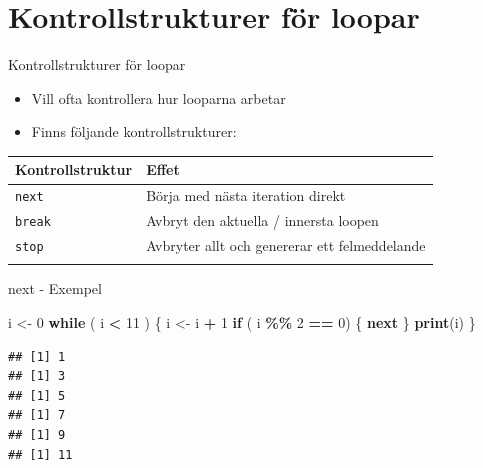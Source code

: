 \documentclass[
  11pt,
  ignorenonframetext,
]{beamer}
\newenvironment{Shaded}{\begin{snugshade}}{\end{snugshade}}
\newcommand{\ControlFlowTok}[1]{\textcolor[rgb]{0.13,0.29,0.53}{\textbf{#1}}}
\newcommand{\DecValTok}[1]{\textcolor[rgb]{0.00,0.00,0.81}{#1}}
\newcommand{\FunctionTok}[1]{\textcolor[rgb]{0.13,0.29,0.53}{\textbf{#1}}}
\newcommand{\NormalTok}[1]{#1}
\newcommand{\OtherTok}[1]{\textcolor[rgb]{0.56,0.35,0.01}{#1}}
\newcommand{\SpecialCharTok}[1]{\textcolor[rgb]{0.81,0.36,0.00}{\textbf{#1}}}
\providecommand{\tightlist}{%
  \setlength{\itemsep}{0pt}\setlength{\parskip}{0pt}}
\begin{document}
\section{Kontrollstrukturer för
loopar}\label{kontrollstrukturer-fuxf6r-loopar}

\begin{frame}{Kontrollstrukturer för loopar}
\label{kontrollstrukturer-fuxf6r-loopar-1}
\begin{itemize}
\tightlist
\item
  Vill ofta kontrollera hur looparna arbetar
\item
  Finns följande kontrollstrukturer:
\end{itemize}

\begin{longtable}[]{@{}ll@{}}
\toprule\noalign{}
\textbf{Kontrollstruktur} & \textbf{Effet} \\
\midrule\noalign{}
\endhead
\texttt{next} & Börja med nästa iteration direkt \\
\texttt{break} & Avbryt den aktuella / innersta loopen \\
\texttt{stop} & Avbryter allt och genererar ett felmeddelande \\
\bottomrule\noalign{}
\end{longtable}
\end{frame}

\begin{frame}[fragile]{next - Exempel}
\label{next---exempel}
\begin{Shaded}
\begin{Highlighting}[]
\NormalTok{i }\OtherTok{\textless{}{-}} \DecValTok{0}
\ControlFlowTok{while}\NormalTok{ ( i }\SpecialCharTok{\textless{}} \DecValTok{11}\NormalTok{ ) \{}
\NormalTok{  i }\OtherTok{\textless{}{-}}\NormalTok{ i }\SpecialCharTok{+} \DecValTok{1}
  \ControlFlowTok{if}\NormalTok{ ( i }\SpecialCharTok{\%\%} \DecValTok{2} \SpecialCharTok{==} \DecValTok{0}\NormalTok{) \{ }\ControlFlowTok{next}\NormalTok{ \}}
  \FunctionTok{print}\NormalTok{(i)}
\NormalTok{\}}
\end{Highlighting}
\end{Shaded}

\pause

\begin{verbatim}
## [1] 1
## [1] 3
## [1] 5
## [1] 7
## [1] 9
## [1] 11
\end{verbatim}
\end{frame}
\end{document}
